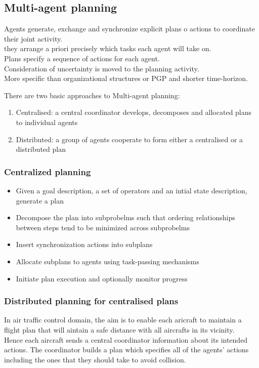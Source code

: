 \subsection{Multi-agent planning}
Agents generate, exchange and synchronize explicit plans o actions to coordinate their joint activity.\\
they arrange a priori precisely which tasks each agent will take on.\\
Plans specify a sequence of actions for each agent.\\
Consideration of uncertainty is moved to the planning activity.\\
More specific than organizational structures or PGP and shorter time-horizon.

There are two basic approaches to Multi-agent planning:
\begin{enumerate}
\item Centralised: a central coordinator develops, decomposes and allocated plans to individual agents
\item Distributed: a group of agents cooperate to form either a centralised or a distributed plan
\end{enumerate}

\subsubsection{Centralized planning}
\begin{itemize}
\item Given a goal description, a set of operators and an intial state description, generate a plan
\item Decompose the plan into subprobelms such that ordering relationships between steps tend to be minimized across subprobelms
\item Insert synchronization actions into subplans
\item Allocate subplans to agents using task-passing mechanisms
\item Initiate plan execution and optionally monitor progress
\end{itemize}
\subsubsection{Distributed planning for centralised plans}
In air traffic control domain, the aim is to enable each aricraft to maintain a flight plan that will aintain a safe distance with all aircrafts in its vicinity.\\
Hence each aircraft sends a central coordinator information about its intended actions. The coordinator builds a plan which specifies all of the agents' actions including the ones that they should take to avoid collision.\\

